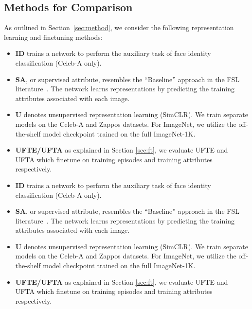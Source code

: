 \subsection{Methods for Comparison}
\savespacebeforesection
\label{sec:baselines}

As outlined in Section~\ref{sec:method}, we consider the following representation
learning and finetuning methods:
\iflatexml
\begin{itemize}
\item \textbf{ID} trains a network to perform the auxiliary task of face
    identity classification (Celeb-A only).
\item \textbf{SA}, or supervised attribute, resembles the ``Baseline'' approach
    in the FSL literature~\citep{closerlook}. The network learns
    representations by predicting the training attributes associated with each
    image.
\item \textbf{U} denotes unsupervised representation learning (SimCLR). We
    train separate models on the Celeb-A and Zappos datasets. For ImageNet, we
    utilize the off-the-shelf model checkpoint trained on the full ImageNet-1K.
\item \textbf{UFTE/UFTA} as explained in Section \ref{sec:ft}, we evaluate UFTE
    and UFTA which finetune on training episodes and training attributes
    respectively.
\end{itemize}
\else
\begin{itemize}[leftmargin=*]
\savespacebeforeitem
\item \textbf{ID} trains a network to perform the auxiliary task of face
identity classification (Celeb-A only).

\savespacebeforeitem
\item \textbf{SA}, or supervised attribute, resembles the ``Baseline'' approach
in the FSL literature~\citep{closerlook}. The network learns representations by
predicting the training attributes associated with each image.

\savespacebeforeitem
{}
\item \textbf{U} denotes unsupervised representation learning (SimCLR). We
train separate models on the Celeb-A and Zappos datasets. For ImageNet, we
utilize the off-the-shelf model checkpoint trained on the full ImageNet-1K.
\item \textbf{UFTE/UFTA} as explained in Section \ref{sec:ft}, we evaluate UFTE
    and UFTA which finetune on training episodes and training attributes
    respectively.
\end{itemize}
\fi

